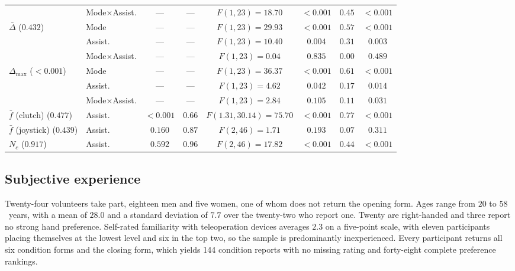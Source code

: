 \begin{table}[p]
\begin{tabular}{@{}llcccccc@{}}
 & Mode$\times$Assist. & --- & --- & $F(1,23)=18.70$ & $<0.001$ & $0.45$ & $<0.001$ \\
\addlinespace[2pt]
$\bar{\Delta}$ ($0.432$) & Mode & --- & --- & $F(1,23)=29.93$ & $<0.001$ & $0.57$ & $<0.001$ \\
 & Assist. & --- & --- & $F(1,23)=10.40$ & $0.004$ & $0.31$ & $0.003$ \\
 & Mode$\times$Assist. & --- & --- & $F(1,23)=0.04$ & $0.835$ & $0.00$ & $0.489$ \\
\addlinespace[2pt]
$\Delta_{\max}$ ($<0.001$) & Mode & --- & --- & $F(1,23)=36.37$ & $<0.001$ & $0.61$ & $<0.001$ \\
 & Assist. & --- & --- & $F(1,23)=4.62$ & $0.042$ & $0.17$ & $0.014$ \\
 & Mode$\times$Assist. & --- & --- & $F(1,23)=2.84$ & $0.105$ & $0.11$ & $0.031$ \\
\addlinespace[2pt]
$\bar{f}$ (clutch) ($0.477$) & Assist. & $<0.001$ & $0.66$ & $F(1.31,30.14)=75.70$ & $<0.001$ & $0.77$ & $<0.001$ \\
\addlinespace[2pt]
$\bar{f}$ (joystick) ($0.439$) & Assist. & $0.160$ & $0.87$ & $F(2,46)=1.71$ & $0.193$ & $0.07$ & $0.311$ \\
\addlinespace[2pt]
$N_c$ ($0.917$) & Assist. & $0.592$ & $0.96$ & $F(2,46)=17.82$ & $<0.001$ & $0.44$ & $<0.001$ \\
\bottomrule
\end{tabular}
\end{table}

\subsection{Subjective experience}
\label{sec:ressubj}

Twenty-four volunteers take part, eighteen men and five women, one of whom does not return the opening form. Ages range from $20$ to $58$~years, with a mean of $28.0$ and a standard deviation of $7.7$ over the twenty-two who report one. Twenty are right-handed and three report no strong hand preference. Self-rated familiarity with teleoperation devices averages $2.3$ on a five-point scale, with eleven participants placing themselves at the lowest level and six in the top two, so the sample is predominantly inexperienced. Every participant returns all six condition forms and the closing form, which yields 144 condition reports with no missing rating and forty-eight complete preference rankings.


